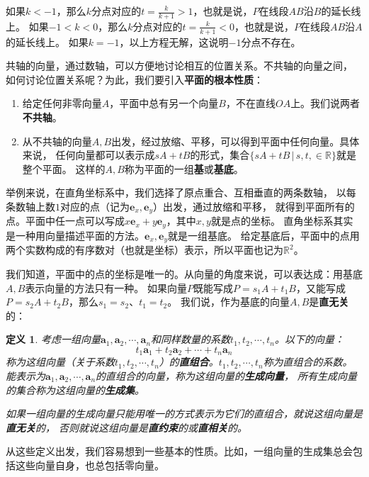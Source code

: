 \documentclass[12pt,UTF8]{ctexbook}
\newtheorem{df}{定义}[section]
\begin{document}
如果$k<-1$，那么$k$分点对应的$t = \frac{k}{k+1} > 1$，也就是说，$P$在线段$AB$沿$B$的延长线上。
如果$-1<k<0$，那么$k$分点对应的$t = \frac{k}{k+1} < 0$，也就是说，$P$在线段$AB$沿$A$的延长线上。
如果$k=-1$，以上方程无解，这说明$-1$分点不存在。

共轴的向量，通过数轴，可以方便地讨论相互的位置关系。不共轴的向量之间，
如何讨论位置关系呢？为此，我们要引入\textbf{平面的根本性质}：
\begin{enumerate}
    \item 给定任何非零向量$A$，平面中总有另一个向量$B$，不在直线$OA$上。我们说两者\textbf{不共轴}。
    \item 从不共轴的向量$A, B$出发，经过放缩、平移，可以得到平面中任何向量。具体来说，
    任何向量都可以表示成$sA + tB$的形式，集合$\{sA + tB \,|\, s, t, \in\mathbb{R}\}$就是整个平面。
    这样的$A, B$称为平面的一组\textbf{基}或\textbf{基底}。
\end{enumerate}

举例来说，在直角坐标系中，我们选择了原点重合、互相垂直的两条数轴，
以每条数轴上数$1$对应的点（记为$\mathbf{e}_x, \mathbf{e}_y$）出发，通过放缩和平移，
就得到平面所有的点。平面中任一点可以写成$x\mathbf{e}_x + y\mathbf{e}_y$，其中$x,y$就是点的坐标。
直角坐标系其实是一种用向量描述平面的方法。$\mathbf{e}_x, \mathbf{e}_y$就是一组基底。
给定基底后，平面中的点用两个实数构成的有序数对（也就是坐标）表示，所以平面也记为$\mathbb{R}^2$。

我们知道，平面中的点的坐标是唯一的。从向量的角度来说，可以表达成：用基底$A, B$表示向量的方法只有一种。
如果向量$P$既能写成$P = s_1A + t_1B$，又能写成$P = s_2A + t_2B$，那么$s_1 = s_2$、$t_1 = t_2$。
我们说，作为基底的向量$A,B$是\textbf{直无关}的：
\begin{df}
    考虑一组向量$\mathbf{a}_1, \mathbf{a}_2, \cdots , \mathbf{a}_n$和同样数量的系数$t_1, t_2, \cdots, t_n$。以下的向量：
    $$ t_1\mathbf{a}_1 + t_2\mathbf{a}_2 + \cdots + t_n\mathbf{a}_n$$
    称为这组向量（关于系数$t_1, t_2, \cdots, t_n$）的\textbf{直组合}。$t_1, t_2, \cdots, t_n$称为直组合的系数。
    能表示为$\mathbf{a}_1, \mathbf{a}_2, \cdots , \mathbf{a}_n$的直组合的向量，称为这组向量的\textbf{生成向量}，
    所有生成向量的集合称为这组向量的\textbf{生成集}。

    如果一组向量的生成向量只能用唯一的方式表示为它们的直组合，就说这组向量是\textbf{直无关}的，
    否则就说这组向量是\textbf{直约束}的或\textbf{直相关}的。
\end{df}
从这些定义出发，我们容易想到一些基本的性质。比如，一组向量的生成集总会包括这些向量自身，也总包括零向量。
\end{document}
